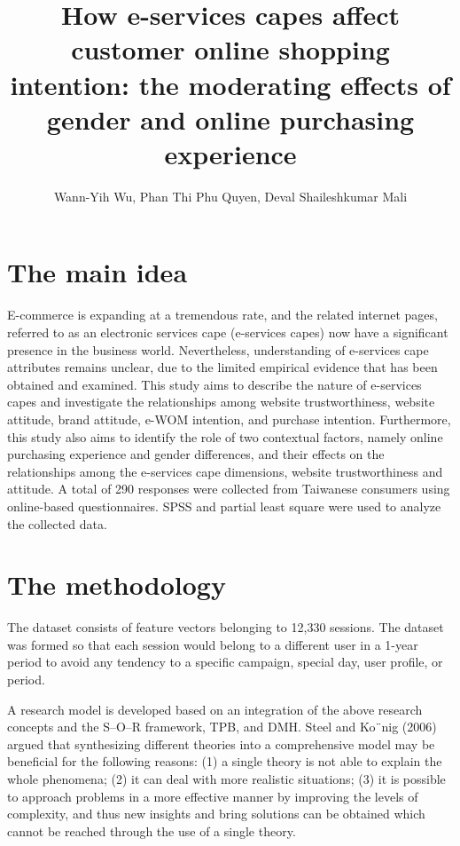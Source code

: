 \documentclass[a4paper]{article}
\title{How e-services capes affect customer online shopping intention: the moderating effects of gender and online purchasing experience}
\author[1]{Wann-Yih Wu, Phan Thi Phu Quyen, Deval Shaileshkumar Mali}
\begin{document}
\maketitle
\section{The main idea}

E-commerce is expanding at a tremendous rate, and the related internet pages, referred to as an electronic services cape (e-services capes) now have a significant presence in the business world. Nevertheless, understanding of e-services cape attributes remains unclear, due to the limited empirical evidence that has been obtained and examined. This study aims to describe the nature of e-services capes and investigate the relationships among website trustworthiness, website attitude, brand attitude, e-WOM intention, and purchase intention. Furthermore, this study also aims to identify the role of two contextual factors, namely online purchasing experience and gender differences, and their effects on the relationships among the e-services cape dimensions, website trustworthiness and attitude. A total of 290 responses were collected from Taiwanese consumers using online-based questionnaires. SPSS and partial least square were used to analyze the collected data.  

\section{The methodology }

The dataset consists of feature vectors belonging to 12,330 sessions. The dataset was formed so that each session would belong to a different user in a 1-year period to avoid any tendency to a specific campaign, special day, user profile, or period.  

A research model is developed based on an integration of the above research concepts and the S–O–R framework, TPB, and DMH. Steel and Ko¨nig (2006) argued that synthesizing different theories into a comprehensive model may be beneficial for the following reasons: (1) a single theory is not able to explain the whole phenomena; (2) it can deal with more realistic situations; (3) it is possible to approach problems in a more effective manner by improving the levels of complexity, and thus new insights and bring solutions can be obtained which cannot be reached through the use of a single theory. 
\end{document}
